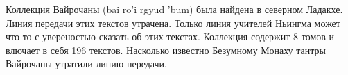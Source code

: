 Коллекция Вайрочаны (bai ro'i rgyud 'bum) была найдена в северном Ладакхе. Линия передачи этих текстов утрачена. Только линия учителей Ньингма может что-то с увереностью сказать об этих текстах. Коллекция содержит 8 томов и влючает в себя 196 текстов. Насколько известно Безумному Монаху тантры Вайрочаны утратили линию передачи.

